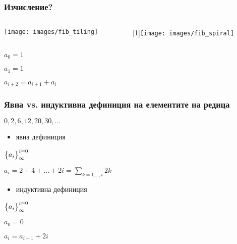 \documentclass{beamer}
\begin{document}
\begin{frame}[fragile]
\frametitle{Изчисление?}


\begin{columns}[c]
  \begin{column}{0.5\textwidth}

    \texttt{[image: images/fib\_tiling]}
  \end{column}
  \begin{column}{0.5\textwidth}
  \vspace*{250pt}
    \begin{turn}{90}
    \scalebox{1}[1]{\texttt{[image: images/fib\_spiral]}}      
    \end{turn}
  \end{column}
\end{columns}


\vspace*{-300pt}
  
$a_0=1$


$a_1=1$


$a_{i+2} = a_{i+1} + a_i $



\end{frame}



\begin{frame}[fragile]
\frametitle{Явна vs. индуктивна дефиниция на елементите на редица}

\begin{center}
$0,2,6,12,20,30,...$ 
\end{center}

\pause

\begin{itemize}
  \item явна дефиниция
\end{itemize}

\begin{center}
  $\big{\{}a_i\big{\}}_\infty^{i=0}$

  \vspace{10px}

  $a_i = 2 + 4 + ... + 2i = \sum\limits_{k=1,..,i}2k$

\end{center}

\pause

\begin{itemize}
  \item индуктивна дефиниция
\end{itemize}


\begin{center}
  $\big{\{}a_i\big{\}}_\infty^{i=0}$

  \vspace{10px}

  $a_0 = 0$

  $a_i = a_{i-1} + 2i$
\end{center}



\end{frame}
\end{document}
